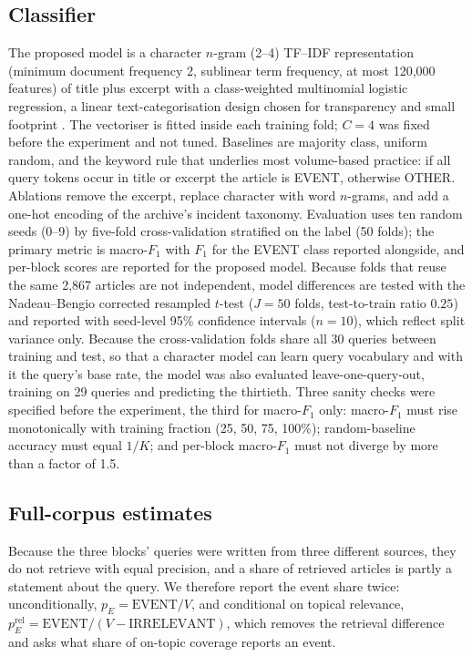 \documentclass[1p,times]{elsarticle}
\begin{document}
\subsection{Classifier}
\label{sec:clf-methods}
The proposed model is a character $n$-gram (2--4) TF--IDF representation (minimum document frequency 2, sublinear term frequency, at most 120,000 features) of title plus excerpt with a class-weighted multinomial logistic regression, a linear text-categorisation design chosen for transparency and small footprint \cite{sebastiani2002}. The vectoriser is fitted inside each training fold; $C = 4$ was fixed before the experiment and not tuned. Baselines are majority class, uniform random, and the keyword rule that underlies most volume-based practice: if all query tokens occur in title or excerpt the article is EVENT, otherwise OTHER. Ablations remove the excerpt, replace character with word $n$-grams, and add a one-hot encoding of the archive's incident taxonomy. Evaluation uses ten random seeds (0--9) by five-fold cross-validation stratified on the label (50 folds); the primary metric is macro-$F_1$ with $F_1$ for the EVENT class reported alongside, and per-block scores are reported for the proposed model. Because folds that reuse the same 2,867 articles are not independent, model differences are tested with the Nadeau--Bengio corrected resampled $t$-test \cite{nadeau2003,dietterich1998} ($J = 50$ folds, test-to-train ratio $0.25$) and reported with seed-level 95\% confidence intervals ($n = 10$), which reflect split variance only. Because the cross-validation folds share all 30 queries between training and test, so that a character model can learn query vocabulary and with it the query's base rate, the model was also evaluated leave-one-query-out, training on 29 queries and predicting the thirtieth. Three sanity checks were specified before the experiment, the third for macro-$F_1$ only: macro-$F_1$ must rise monotonically with training fraction (25, 50, 75, 100\%); random-baseline accuracy must equal $1/K$; and per-block macro-$F_1$ must not diverge by more than a factor of 1.5.

\subsection{Full-corpus estimates}
Because the three blocks' queries were written from three different sources, they do not retrieve with equal precision, and a share of retrieved articles is partly a statement about the query. We therefore report the event share twice: unconditionally, $p_E = \mathrm{EVENT}/V$, and conditional on topical relevance, $p_E^{\mathrm{rel}} = \mathrm{EVENT}/(V - \mathrm{IRRELEVANT})$, which removes the retrieval difference and asks what share of on-topic coverage reports an event.
\end{document}
